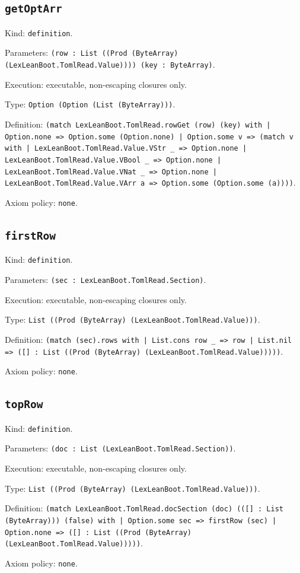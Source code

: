 \documentclass[11pt]{article}
\begin{document}
\subsection*{\texttt{getOptArr}}
\noindent Kind: \texttt{definition}.\par
\noindent Parameters: \texttt{(row : List ((Prod (ByteArray) (LexLeanBoot.TomlRead.Value)))) (key : ByteArray)}.\par
\noindent Execution: executable, non-escaping closures only.\par
\noindent Type: \texttt{Option (Option (List (ByteArray)))}.\par
\noindent Definition: \texttt{(match LexLeanBoot.TomlRead.rowGet (row) (key) with | Option.none => Option.some (Option.none) | Option.some v => (match v with | LexLeanBoot.TomlRead.Value.VStr \_ => Option.none | LexLeanBoot.TomlRead.Value.VBool \_ => Option.none | LexLeanBoot.TomlRead.Value.VNat \_ => Option.none | LexLeanBoot.TomlRead.Value.VArr a => Option.some (Option.some (a))))}.\par
\noindent Axiom policy: \texttt{none}.\par
\subsection*{\texttt{firstRow}}
\noindent Kind: \texttt{definition}.\par
\noindent Parameters: \texttt{(sec : LexLeanBoot.TomlRead.Section)}.\par
\noindent Execution: executable, non-escaping closures only.\par
\noindent Type: \texttt{List ((Prod (ByteArray) (LexLeanBoot.TomlRead.Value)))}.\par
\noindent Definition: \texttt{(match (sec).rows with | List.cons row \_ => row | List.nil => ([] : List ((Prod (ByteArray) (LexLeanBoot.TomlRead.Value)))))}.\par
\noindent Axiom policy: \texttt{none}.\par
\subsection*{\texttt{topRow}}
\noindent Kind: \texttt{definition}.\par
\noindent Parameters: \texttt{(doc : List (LexLeanBoot.TomlRead.Section))}.\par
\noindent Execution: executable, non-escaping closures only.\par
\noindent Type: \texttt{List ((Prod (ByteArray) (LexLeanBoot.TomlRead.Value)))}.\par
\noindent Definition: \texttt{(match LexLeanBoot.TomlRead.docSection (doc) (([] : List (ByteArray))) (false) with | Option.some sec => firstRow (sec) | Option.none => ([] : List ((Prod (ByteArray) (LexLeanBoot.TomlRead.Value)))))}.\par
\noindent Axiom policy: \texttt{none}.\par
\end{document}
